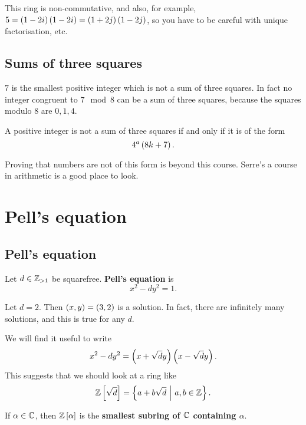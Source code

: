 \begin{note*}
This ring is non-commutative, and also, for example, $ 5 = \br{1 - 2i}\br{1 - 2i} = \br{1 + 2j}\br{1 - 2j} $, so you have to be careful with unique factorisation, etc.
\end{note*}

\subsection{Sums of three squares}

$ 7 $ is the smallest positive integer which is not a sum of three squares. In fact no integer congruent to $ 7 \mod 8 $ can be a sum of three squares, because the squares modulo $ 8 $ are $ 0, 1, 4 $.

\begin{theorem}
A positive integer is not a sum of three squares if and only if it is of the form
$$ 4^a\br{8k + 7}. $$
\end{theorem}

Proving that numbers are not of this form is beyond this course. Serre's a course in arithmetic is a good place to look.

\pagebreak

\section{Pell's equation}

\subsection{Pell's equation}

Let $ d \in \mathbb{Z}_{> 1} $ be squarefree. \textbf{Pell's equation} is
$$ x^2 - dy^2 = 1. $$

\begin{example*}
Let $ d = 2 $. Then $ \br{x, y} = \br{3, 2} $ is a solution. In fact, there are infinitely many solutions, and this is true for any $ d $.
\end{example*}

We will find it useful to write
$$ x^2 - dy^2 = \br{x + \sqrt{d}y}\br{x - \sqrt{d}y}. $$
This suggests that we should look at a ring like
$$ \ZZ\sbr{\sqrt{d}} = \cbr{a + b\sqrt{d} \st a, b \in \ZZ}. $$

\begin{definition}
If $ \alpha \in \mathbb{C} $, then $ \ZZ\sbr{\alpha} $ is the \textbf{smallest subring of $ \mathbb{C} $ containing $ \alpha $}.
\end{definition}


